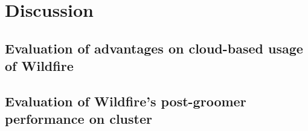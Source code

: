 
\chapter{Discussion}

\section{Evaluation of advantages on cloud-based usage of Wildfire}

\section{Evaluation of Wildfire's post-groomer performance on cluster}